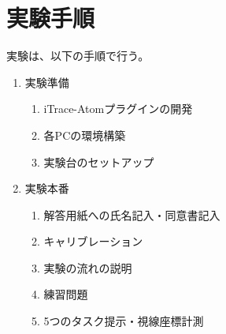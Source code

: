 \documentclass[paper=a4paper,fontsize=11pt]{jlreq}
\begin{document}
  \section{実験手順}
  実験は、以下の手順で行う。
  \begin{enumerate}
    \item 実験準備
      \begin{enumerate}
        \item iTrace-Atomプラグインの開発
        \item 各PCの環境構築
        \item 実験台のセットアップ
      \end{enumerate}
    \item 実験本番
      \begin{enumerate}
        \item 解答用紙への氏名記入・同意書記入
        \item キャリブレーション
        \item 実験の流れの説明
        \item 練習問題
        \item 5つのタスク提示・視線座標計測
      \end{enumerate}
  \end{enumerate}
\end{document}
